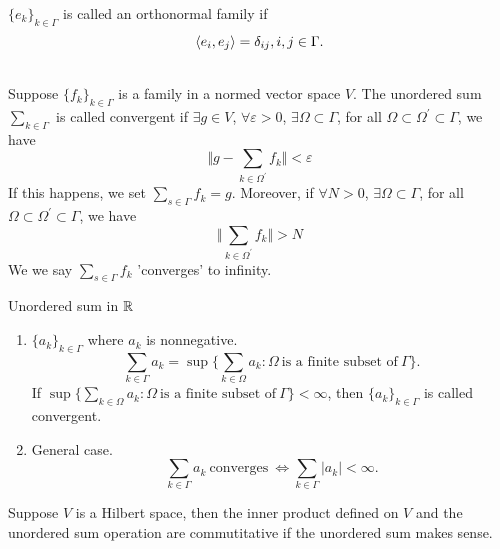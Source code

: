\begin{definition}
	$\{e_k\}_{k \in \Gamma}$ is called an orthonormal family if 
$$
{\langle e_i,e_j\rangle}=\delta_{ij}, i,j \in \Gamma.
$$
\end{definition}
\begin{definition} \ \\
	Suppose $\{f_k\}_{k \in \Gamma}$ is a family in a normed vector space $V$. The unordered sum $\sum_{k \in \Gamma}$ is called convergent if $\exists g \in V$, $\forall \varepsilon >0$, $\exists \Omega \subset \Gamma$, for all $\Omega \subset \Omega^\prime \subset \Gamma$, we have
	$$
	\Vert g - \sum_{k\in \Omega^\prime}f_k \Vert < \varepsilon
	$$
If this happens, we set $\sum_{s\in \Gamma}f_k = g$. Moreover, if $\forall N >0$, $\exists \Omega \subset \Gamma$, for all $\Omega \subset \Omega^\prime \subset \Gamma$, we have
$$
\Vert \sum_{k\in \Omega^\prime}f_k \Vert > N
$$
We we say $\sum_{s\in \Gamma}f_k$ 'converges' to infinity.
\end{definition}

\begin{sexample}{Unordered sum in $\mathbb{R}$}{}
	\begin{enumerate}
		\item $\{a_k\}_{k \in \Gamma}$ where $a_k$ is nonnegative.
$$
\sum_{k \in \Gamma}a_k = \sup\{\sum_{k \in \Omega}a_k: \Omega \ \text{is a finite subset of} \ \Gamma \}.
$$
If $\sup\{\sum_{k \in \Omega}a_k: \Omega \ \text{is a finite subset of} \ \Gamma \} < \infty$, then $\{a_k\}_{k \in \Gamma}$ is called convergent.
		\item General case.
$$
\sum_{k \in \Gamma}a_k \ \text{converges} \ \iff \sum_{k \in \Gamma}|a_k| < \infty.
$$
	\end{enumerate}
\end{sexample}

\begin{stheorem}{}{}
Suppose $V$ is a Hilbert space, then the inner product defined on $V$ and the unordered sum operation are commutitative if the unordered sum makes sense.
\end{stheorem}








